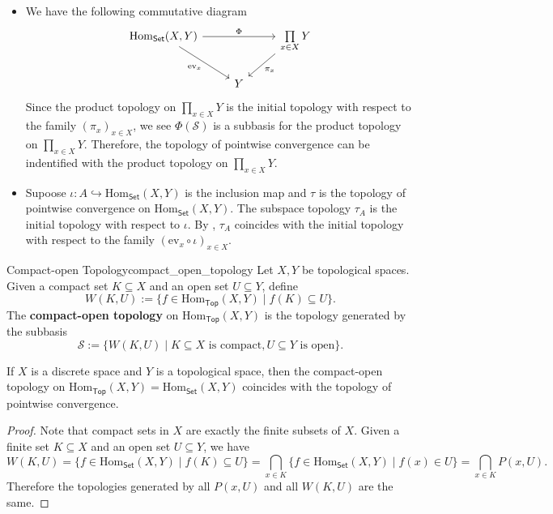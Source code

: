 \documentclass{report}
\begin{document}
\begin{remark}
	\begin{itemize}
		\item We have the following commutative diagram
    \[
		\begin{tikzcd}
			{\mathrm{Hom}_{\mathsf{Set}}(X,Y)} \arrow[rr, "\Phi"] \arrow[rd, "\mathrm{ev}_x"'] &   & \prod\limits_{x\in X}Y \arrow[ld, "\pi_x"] \\
																							   & Y &                                           
		\end{tikzcd}
	\]
	Since the product topology on $\prod\limits_{x\in X}Y$ is the initial topology with respect to the family $\left( \pi_x \right)_{x\in X}$, we see $\Phi\left(\mathcal{S}\right)$ is a subbasis for the product topology on $\prod\limits_{x\in X}Y$. Therefore, the topology of pointwise convergence can be indentified with the product topology on $\prod\limits_{x\in X}Y$.
	  \item Supoose $\iota: A\hookrightarrow \mathrm{Hom}_{\mathsf{Set}}(X,Y)$ is the inclusion map and $\tau$ is the topology of pointwise convergence on $\mathrm{Hom}_{\mathsf{Set}}(X,Y)$. The subspace topology $\tau_A$ is the initial topology with respect to $\iota$. By , $\tau_A$ coincides with the initial topology with respect to the family $\left( \mathrm{ev}_x\circ\iota \right)_{x\in X}$.
	\end{itemize}
\end{remark}

\begin{definition}{Compact-open Topology}{compact_open_topology}
	Let $X,Y$ be topological spaces. Given a compact set $K\subseteq X$ and an open set $U \subseteq Y$, define
	\[
		W(K,U):=\{f\in\mathrm{Hom}_{\mathsf{Top}}(X,Y)\mid f(K)\subseteq U\}.
	\]
	The \textbf{compact-open topology} on $\mathrm{Hom}_{\mathsf{Top}}(X,Y)$ is the topology generated by the subbasis 
	\[
		\mathcal{S}:=\{W(K,U)\mid K\subseteq X \text{ is compact}, U\subseteq Y \text{ is open}\}.
	\]
\end{definition}

\begin{proposition}{}{}
	If $X$ is a discrete space and $Y$ is a topological space, then the compact-open topology on $\mathrm{Hom}_{\mathsf{Top}}(X,Y)=\mathrm{Hom}_{\mathsf{Set}}(X,Y)$ coincides with the topology of pointwise convergence.
\end{proposition}
\begin{proof}
	Note that compact sets in $X$ are exactly the finite subsets of $X$. Given a finite set $K\subseteq X$ and an open set $U\subseteq Y$, we have
	\[
		W(K,U)=\{f\in\mathrm{Hom}_{\mathsf{Set}}(X,Y)\mid f(K)\subseteq U\}=\bigcap_{x\in K} \{f\in\mathrm{Hom}_{\mathsf{Set}}(X,Y)\mid f(x)\in U\}=\bigcap_{x\in K} P(x,U).
	\]
	Therefore the topologies generated by all $P(x,U)$ and all $W(K,U)$ are the same.
\end{proof}
\end{document}
